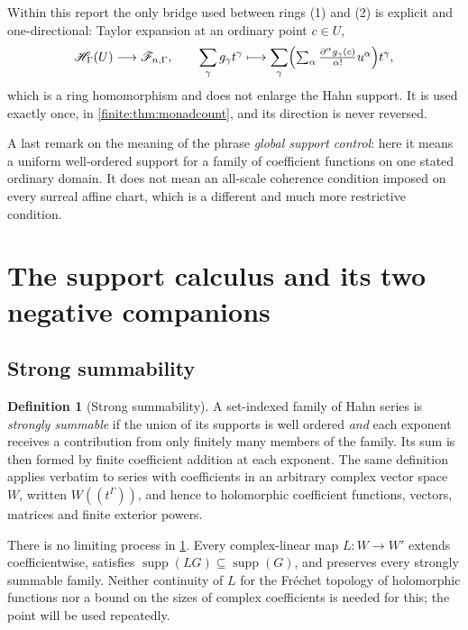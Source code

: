 \documentclass[11pt,letterpaper]{article}
\theoremstyle{definition}
\newtheorem{definition}[theorem]{Definition}
\theoremstyle{remark}
\newcommand{\HH}{\mathscr H}
\newcommand{\Af}{\mathscr F}
\DeclareMathOperator{\supp}{supp}
\numberwithin{equation}{section}
\begin{document}
Within this report the only bridge used between rings (1) and (2) is explicit and one-directional: Taylor expansion at an ordinary point $c\in U$,
\begin{equation}\label{finite:eq:taylorbridge}
 \HH_\Gamma(U)\longrightarrow\Af_{n,\Gamma},
 \qquad
 \sum_\gamma g_\gamma t^\gamma\longmapsto
 \sum_\gamma\Bigl(\textstyle\sum_\alpha\frac{\partial^\alpha g_\gamma(c)}{\alpha!}u^\alpha\Bigr)t^\gamma,
\end{equation}
which is a ring homomorphism and does not enlarge the Hahn support. It is used exactly once, in \cref{finite:thm:monadcount}, and its direction is never reversed.

A last remark on the meaning of the phrase \emph{global support control}: here it means a uniform well-ordered support for a family of coefficient functions on one stated ordinary domain. It does not mean an all-scale coherence condition imposed on every surreal affine chart, which is a different and much more restrictive condition.

\section{The support calculus and its two negative companions}
\label{finite:sec:support}

\subsection{Strong summability}
\label{finite:sec:strong}

\begin{definition}[Strong summability]
\label{finite:def:strong}
A set-indexed family of Hahn series is \emph{strongly summable} if the union of its supports is well ordered \emph{and} each exponent receives a contribution from only finitely many members of the family. Its sum is then formed by finite coefficient addition at each exponent. The same definition applies verbatim to series with coefficients in an arbitrary complex vector space $W$, written $W((t^\Gamma))$, and hence to holomorphic coefficient functions, vectors, matrices and finite exterior powers.
\end{definition}

There is no limiting process in \cref{finite:def:strong}. Every complex-linear map $L:W\to W'$ extends coefficientwise, satisfies $\supp(LG)\subseteq\supp(G)$, and preserves every strongly summable family. Neither continuity of $L$ for the Fr\'echet topology of holomorphic functions nor a bound on the sizes of complex coefficients is needed for this; the point will be used repeatedly.
\end{document}

